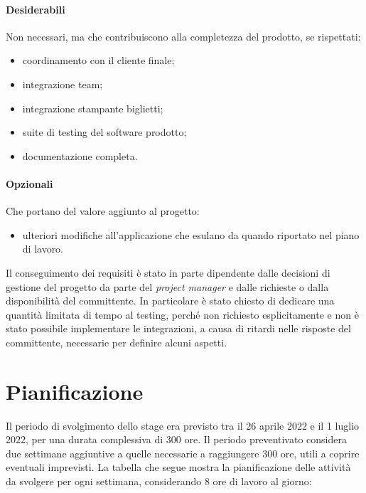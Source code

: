 \paragraph{Desiderabili} Non necessari, ma che contribuiscono alla completezza del prodotto, se rispettati:
\begin{itemize}
	\item coordinamento con il cliente finale;
	\item integrazione team;
	\item integrazione stampante biglietti;
	\item suite di testing del software prodotto;
	\item documentazione completa.
\end{itemize}

\paragraph{Opzionali} Che portano del valore aggiunto al progetto:
\begin{itemize}
	\item ulteriori modifiche all'applicazione che esulano da quando riportato nel piano di lavoro.
\end{itemize}

\noindent Il conseguimento dei requisiti è stato in parte dipendente dalle decisioni di gestione del progetto da parte del \emph{project manager} e dalle richieste o dalla disponibilità del committente. In particolare è stato chiesto di dedicare una quantità limitata di tempo al testing, perché non richiesto esplicitamente e non è stato possibile implementare le integrazioni, a causa di ritardi nelle risposte del committente, necessarie per definire alcuni aspetti.


\section{Pianificazione}
Il periodo di svolgimento dello stage era previsto tra il 26 aprile 2022 e il 1 luglio 2022, per una durata complessiva di 300 ore. Il periodo preventivato considera due settimane aggiuntive a quelle necessarie a raggiungere 300 ore, utili a coprire eventuali imprevisti. La tabella che segue mostra la pianificazione delle attività da svolgere per ogni settimana, considerando 8 ore di lavoro al giorno:

